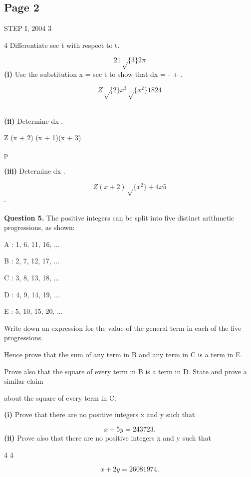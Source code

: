 \documentclass[12pt]{article}
\begin{document}
\subsection*{Page 2}
\begin{flushleft}
STEP I, 2004 3\par
4 Differentiate sec t with respect to t.\par
\[2 1 \sqrt\{3\} 2 \pi\]
\textbf{(i)} Use the substitution x = sec t to show that dx = - + .\par
\[Z \sqrt\{2\} x^3\sqrt\{x^2\} 1 8 24\]
-\par
\textbf{(ii)} Determine dx .\par
Z (x + 2) (x + 1)(x + 3)\par
p\par
\textbf{(iii)} Determine dx .\par
\[Z (x + 2)\sqrt\{x^2\} + 4x 5\]
-\par
\bigskip\textbf{Question 5.} The positive integers can be split into five distinct arithmetic progressions, as shown:\par
A : 1, 6, 11, 16, ...\par
B : 2, 7, 12, 17, ...\par
C : 3, 8, 13, 18, ...\par
D : 4, 9, 14, 19, ...\par
E : 5, 10, 15, 20, ...\par
Write down an expression for the value of the general term in each of the five progressions.\par
Hence prove that the sum of any term in B and any term in C is a term in E.\par
Prove also that the square of every term in B is a term in D. State and prove a similar claim\par
about the square of every term in C.\par
\textbf{(i)} Prove that there are no positive integers x and y such that\par
\[x + 5y = 243 723 .\]
\textbf{(ii)} Prove also that there are no positive integers x and y such that\par
4 4\par
\[x + 2y = 26 081 974 .\]
\end{flushleft}
\end{document}
